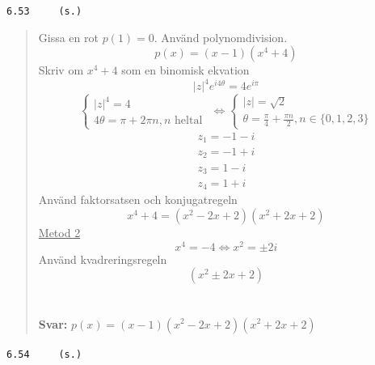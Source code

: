 \documentclass[a4paper]{article}
\newcommand{\tskcol}[1]{\textcolor{tskcol}{#1}}
\begin{document}
	\texttt{\tskcol{6.53~~~~ (s.)}}
	\begin{quotation}
		\noindent
		Gissa en rot $p(1) = 0$.
		Använd polynomdivision.
		\begin{equation*}
			p(x)=(x-1)\left(x^{4}+4\right)
			\end{equation*}
		Skriv om $x^4+4$ som en binomisk ekvation
		\[\left\lvert z\right\rvert^4e^{i4\theta} = 4e^{i\pi}  \]
		\begin{equation*}
			\left\{\begin{array}{l}
			\left\lvert z\right\rvert ^{4}=4 \\
			4\theta=\pi+2 \pi n, n \text { heltal }
			\end{array}\right.
			\Leftrightarrow
				\left\{\begin{array}{l}
				|z|=\sqrt{2} \\
				\theta=\frac{\pi}{4}+\frac{\pi n}{2}, n \in\{0,1,2,3\}
				\end{array}\right.
				\end{equation*}
				\begin{equation*}
					\begin{array}{l}
					z_1=-1-i \\
					z_2=-1+i \\
					z_3=1-i \\
					z_4=1+i
					\end{array}
					\end{equation*}
			Använd faktorsatsen och konjugatregeln
			\begin{equation*}
				x^4+4 = \left(x^{2}-2 x+2\right)\left(x^{2}+2 x+2\right)
			\end{equation*}
			\underline{Metod 2}\\
			\begin{equation*}
				x^{4}=-4 \Leftrightarrow x^{2}=\pm 2 i
			\end{equation*}
			Använd kvadreringsregeln
			\[\left(x^{2}\pm 2 x+2\right)\]
		\\ \\
		\textbf{Svar:} $p(x)=(x-1)\left(x^{2}-2 x+2\right)\left(x^{2}+2 x+2\right)$
	\end{quotation}
	\texttt{\tskcol{6.54~~~~ (s.)}}
\end{document}
